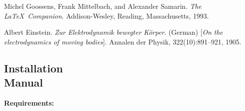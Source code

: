\documentclass[12pt, a4paper, twoside]{article}
\begin{document}
\begin{thebibliography}{9}
    Michel Goossens, Frank Mittelbach, and Alexander Samarin. 
    \textit{The \LaTeX\ Companion}. 
    Addison-Wesley, Reading, Massachusetts, 1993.
    
    Albert Einstein. 
    \textit{Zur Elektrodynamik bewegter K{\"o}rper}. (German) 
    [\textit{On the electrodynamics of moving bodies}]. 
    Annalen der Physik, 322(10):891–921, 1905.
\end{thebibliography}

\newpage

\begin{umaappendices}
\section{Installation \\ Manual}
    
    \textbf{\large{Requirements:}}
    
    \blindtext

\end{umaappendices}









\newpage



\end{document}
